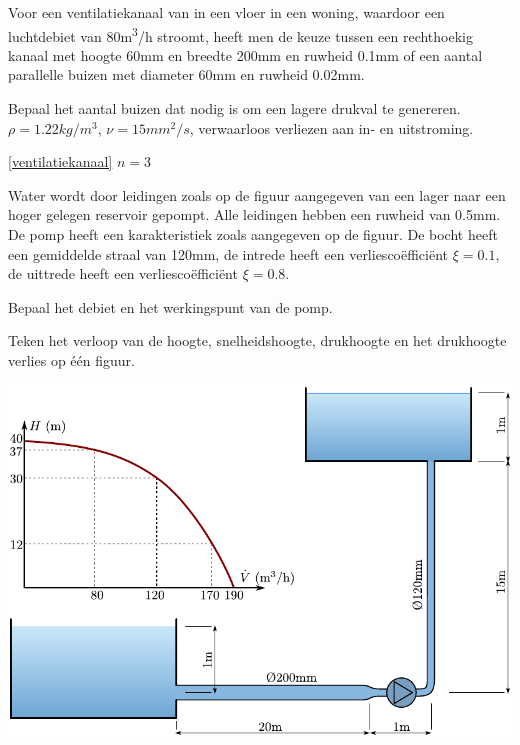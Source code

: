 \begin{toepassing}
	\label{ventilatiekanaal}
Voor een ventilatiekanaal van in een vloer in een woning, waardoor een luchtdebiet van 80\unit{m^3/h} stroomt, heeft men de keuze tussen een rechthoekig kanaal met hoogte 60mm en breedte 200mm en ruwheid 0.1mm of een aantal parallelle buizen met diameter 60mm en ruwheid 0.02mm. 
		
Bepaal het aantal buizen dat nodig is om een lagere drukval te genereren. $\rho = 1.22\unit{kg/m^3}$, $\nu = 15\unit{mm^2/s}$, verwaarloos verliezen aan in- en uitstroming.
\end{toepassing}
\begin{antwoord}{\ref{ventilatiekanaal}}
	$n = 3$
\end{antwoord}
\begin{toepassing}[*]
	\label{pompopvoerhoogte}
	Water wordt door leidingen zoals op de figuur aangegeven van een lager naar een hoger gelegen reservoir gepompt. Alle leidingen hebben een ruwheid van 0.5mm. De pomp heeft een karakteristiek zoals aangegeven op de figuur. De bocht heeft een gemiddelde straal van 120mm, de intrede heeft een verliescoëfficiënt $\xi = 0.1$, de uittrede heeft een verliescoëfficiënt $\xi = 0.8$.
		
Bepaal het debiet en het werkingspunt van de pomp.
		
Teken het verloop van de hoogte, snelheidshoogte, drukhoogte en het drukhoogte verlies op één figuur.

	\centering
	\includegraphics{fig/stroming_in_leidingen/pompopvoerhoogte}
\end{toepassing}
